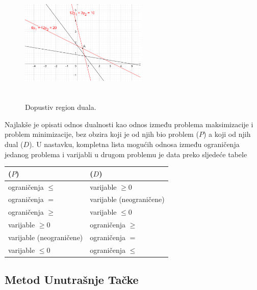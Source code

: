 \documentclass[a4paper, utf8, 11pt, colorlinks]{article}
\begin{document}
\begin{figure}[!ht]
    \centering
    \includegraphics[width=170pt, height=170pt]{fig6.eps}
    \caption{Dopustiv region duala.}
    \label{fig:fig6-dual-region}
\end{figure}

Najlakše je opisati odnos dualnosti kao odnos između problema maksimizacije i problem minimizacije, bez obzira 
koji je od njih bio problem ($P$) a koji od njih  dual ($D$). 
U nastavku, kompletna lista mogućih odnosa između ograničenja
jedanog problema i varijabli u drugom problemu je data preko sljedeće tabele
\begin{table}[!ht]
\begin{tabular}{l|l}
      ($P$) & ($D$) \\ \hline
      ograničenja $\leq$  & varijable $\geq 0$ \\
      ograničenja $=$     & varijable (neograničene) \\
      ograničenja $\geq$  & varijable $\leq 0$ \\
      varijable $\geq 0$    & ograničenja $\geq$ \\
      varijable (neograničene) & ograničenja $=$ \\
      varijable $\leq 0$         & ograničenja $\leq$ \\ \hline
 \end{tabular}

\end{table}


\subsection{Metod Unutrašnje Tačke}
\end{document}
